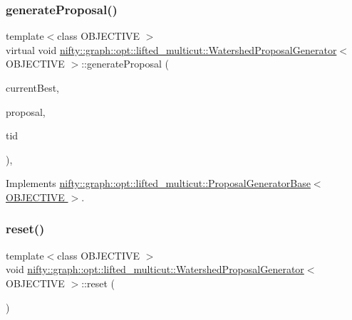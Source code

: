 \subsubsection{\texorpdfstring{generate\+Proposal()}{generateProposal()}}
{\footnotesize\ttfamily template$<$class O\+B\+J\+E\+C\+T\+I\+VE $>$ \\
virtual void \hyperlink{classnifty_1_1graph_1_1opt_1_1lifted__multicut_1_1WatershedProposalGenerator}{nifty\+::graph\+::opt\+::lifted\+\_\+multicut\+::\+Watershed\+Proposal\+Generator}$<$ O\+B\+J\+E\+C\+T\+I\+VE $>$\+::generate\+Proposal (\begin{DoxyParamCaption}\item[{const \hyperlink{classnifty_1_1graph_1_1opt_1_1lifted__multicut_1_1ProposalGeneratorBase_ab102e54a80aba7ed8884d61ae0803954}{Node\+Labels\+Type} \&}]{current\+Best,  }\item[{\hyperlink{classnifty_1_1graph_1_1opt_1_1lifted__multicut_1_1ProposalGeneratorBase_ab102e54a80aba7ed8884d61ae0803954}{Node\+Labels\+Type} \&}]{proposal,  }\item[{const size\+\_\+t}]{tid }\end{DoxyParamCaption})\hspace{0.3cm}{\ttfamily [inline]}, {\ttfamily [virtual]}}



Implements \hyperlink{classnifty_1_1graph_1_1opt_1_1lifted__multicut_1_1ProposalGeneratorBase_ae00635fcec34663a1ec72cac36514e0a}{nifty\+::graph\+::opt\+::lifted\+\_\+multicut\+::\+Proposal\+Generator\+Base$<$ O\+B\+J\+E\+C\+T\+I\+V\+E $>$}.

\mbox{\label{classnifty_1_1graph_1_1opt_1_1lifted__multicut_1_1WatershedProposalGenerator_aeb719bc98cef132258b1f366d0f5e5e2}} 
\subsubsection{\texorpdfstring{reset()}{reset()}}
{\footnotesize\ttfamily template$<$class O\+B\+J\+E\+C\+T\+I\+VE $>$ \\
void \hyperlink{classnifty_1_1graph_1_1opt_1_1lifted__multicut_1_1WatershedProposalGenerator}{nifty\+::graph\+::opt\+::lifted\+\_\+multicut\+::\+Watershed\+Proposal\+Generator}$<$ O\+B\+J\+E\+C\+T\+I\+VE $>$\+::reset (\begin{DoxyParamCaption}{ }\end{DoxyParamCaption})\hspace{0.3cm}{\ttfamily [inline]}}



